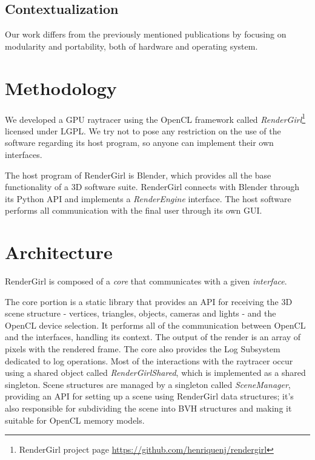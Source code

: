\documentclass{vgtc}
\begin{document}
\subsection{Contextualization}

Our work differs from the previously mentioned publications by
focusing on modularity and portability, both of hardware and operating
system.

\section{Methodology}
\label{sec:methodology}

We developed a GPU raytracer using the OpenCL framework called
\emph{RenderGirl}\footnote{RenderGirl project page
  \url{https://github.com/henriquenj/rendergirl}} licensed under LGPL.
We try not to pose any restriction on the use of the software
regarding its host program, so anyone can implement their own
interfaces.

The host program of RenderGirl is Blender, which provides all the base
functionality of a 3D software suite. RenderGirl connects with Blender
through its Python API and implements a \emph{RenderEngine}
interface. The host software performs all communication with the final
user through its own GUI.

\section{Architecture}
\label{sec:architecture}

RenderGirl is composed of a \emph{core} that communicates with a given
\emph{interface}.

The core portion is a static library that provides an API for
receiving the 3D scene structure - vertices, triangles, objects,
cameras and lights - and the OpenCL device selection. It performs all of the
communication between OpenCL and the interfaces, handling its
context. The output of the render is an array of pixels with the
rendered frame. The core also provides the Log Subsystem dedicated to
log operations. Most of the interactions with the raytracer occur
using a shared object called \emph{RenderGirlShared}, which is
implemented as a shared singleton. Scene structures are managed by a
singleton called \emph{SceneManager}, providing an API for setting up
a scene using RenderGirl data structures; it's also responsible for
subdividing the scene into BVH structures and making it suitable for
OpenCL memory models.
\end{document}
